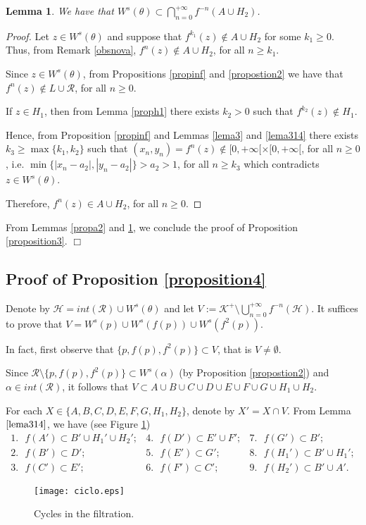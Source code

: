 \documentclass[11pt]{amsart}
\newtheorem{lemma}[theorem]{Lemma}
\theoremstyle{definition}
\begin{document}
\begin{lemma}
	We have that $\displaystyle W^s(\theta)\subset \bigcap_{n=0}^{+\infty}f^{-n}(A\cup H_2)$. \label{propa3}
\end{lemma}
\begin{proof}
Let $z\in W^s(\theta)$ and suppose that $f^{k_1} (z)\notin A\cup H_2$ for some $k_1\geq 0$. Thus, from Remark \ref{obsnova}, $f^n (z)\notin A\cup H_2$, for all $n\geq k_1$.

Since $z\in W^s(\theta)$,  from Propositions \ref{propinf} and \ref{propostion2} we have that $f^n(z)\notin L\cup \mathcal{R}$, for all $n\geq 0$.

If $z\in H_1$, then  from Lemma \ref{proph1} there exists $k_2>0$ such that $f^{k_2}(z)\notin H_1$.

Hence, from Proposition \ref{propinf} and Lemmas \ref{lema3} and \ref{lema314} there exists $k_3\geq\max\{k_1,k_2\}$ such that $(x_n,y_n)=f^n(z)\notin [0,+\infty[\times[0,+\infty [$, for all $n\geq 0$, i.e. $\min\{|x_n-a_2|,|y_n-a_2|\}>a_2>1$, for all $n\geq k_3$ which contradicts $z\in W^s(\theta)$.

Therefore, $f^n (z)\in A\cup H_2$, for all $n\geq 0$.
\end{proof}

From Lemmas \ref{propa2} and \ref{propa3}, we conclude the proof of Proposition \ref{proposition3}. \hfil $\Box$

\smallskip 

\subsection{Proof of Proposition \ref{proposition4}} \label{subsecwsp}
Denote by $\mathcal{H}=int (\mathcal{R}) \cup W^s(\theta)$ and let $V:=\mathcal{K}^+\setminus\bigcup_{n=0}^{+\infty}f^{-n}(\mathcal{H})$. It suffices to prove that $V= W^s(p)\cup W^s(f(p))\cup W^s(f^2(p))$.

In fact, first observe that $\{p,f(p),f^2(p)\}\subset V$, that is $V\neq\emptyset$.

Since $\mathcal{R}\setminus \{p,f(p),f^2(p)\} \subset W^s(\alpha)$ (by Proposition \ref{propostion2}) and $\alpha \in int(\mathcal{R})$, it follows that $V\subset A\cup B\cup C\cup D\cup E\cup F\cup G\cup H_1\cup H_2$.

For each $X\in\{A,B,C,D,E,F,G,H_1,H_2\}$, denote by $X'=X\cap V$. From Lemma $\ref{lema314}$, we have (see Figure \ref{fig6})
$$
\begin{array}{lll}
1. \textrm{ } f(A')\subset B'\cup H_1'\cup H_2'; & 4. \textrm{ } f(D')\subset E'\cup F'; &  7. \textrm{ } f(G')\subset B';\\
2. \textrm{ } f(B')\subset D'; & 5. \textrm{ } f(E')\subset G'; & 8. \textrm{ } f(H_1')\subset B'\cup H_1';  \\
3. \textrm{ } f(C')\subset E'; & 6. \textrm{ } f(F')\subset C'; & 9. \textrm{ } f(H_2')\subset B'\cup A'.
\end{array}
$$		
\begin{figure}[!h]
		\centering
		\texttt{[image: ciclo.eps]}
		\caption{Cycles in the filtration.} \label{fig6}
	\end{figure}
	
\end{document}
